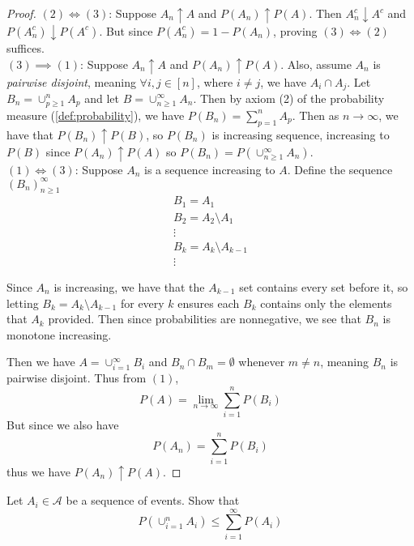 \documentclass[../main.tex]{subfiles}
\begin{document}
\begin{proof}
$ (2) \iff (3) $: Suppose $A_n \uparrow A$ and $P(A_n) \uparrow P(A)$.
Then $A_n^c \downarrow A^c$ and $P(A^c_n) \downarrow P(A^c)$. But since 
$P(A_n^c) = 1 - P(A_n)$, proving $(3) \iff (2)$ suffices.\\
$(3) \implies (1) $: Suppose $A_n \uparrow A$ and $P(A_n) \uparrow P(A)$. Also, assume 
$A_n$ is \textit{pairwise disjoint}, meaning $\forall i,j \in [n]$, where $i\neq j$, we have $A_i \cap A_j$.
Let $B_n = \cup^n_{p\geq 1}{A_p}$ and let $B = \cup^\infty_{n\geq 1}{A_n}$.
Then by axiom (2) of the probability measure (\ref{def:probability}), we have
$P(B_n) = \sum^n_{p=1}{A_p}$. Then as $n \to \infty$, we have that $P(B_n)\uparrow P(B)$, so $P(B_n)$ is
increasing sequence, increasing to $P(B)$ since $P(A_n) \uparrow P(A)$ so $P(B_n) = P(\cup^\infty_{n\geq 1}{A_n})$.\\
$ (1) \iff (3) $: Suppose $A_n$ is a sequence increasing to $A$. Define the sequence $(B_n)^\infty_{n\geq 1}$
\begin{gather*}
    B_1 = A_1 \\
    B_2 = A_2 \setminus A_1 \\
     \vdots \\
    B_k = A_k \setminus A_{k-1} \\
     \vdots 
\end{gather*}
\begin{remark} Since $A_n$ is increasing, we have that the $A_{k-1}$ set contains every
set before it, so letting $B_k = A_k \setminus A_{k-1}$ for every $k$ 
ensures each $B_k$ contains only the elements that $A_k$ provided. Then since probabilities are nonnegative, 
we see that $B_n$ is monotone increasing.
\end{remark}
Then we have $A= \cup^\infty_{i=1}{B_i}$ and $B_n \cap B_m = \emptyset$
whenever $m \neq n$, meaning $B_n$ is pairwise disjoint. Thus from $(1)$,\[
P(A) = \lim_{n\to\infty}{\sum^n_{i=1}{P(B_i)}}
\]
But since we also have \[
P(A_n) = \sum^n_{i=1}{P(B_i)}
\]
thus we have $P(A_n) \uparrow P(A)$.
\end{proof}










\begin{exercise}
Let $A_i \in \mathcal{A}$ be a sequence of events. Show that 
\[
P(\cup^n_{i=1}{A_i}) \leq \sum_{i=1}^{\infty}{P(A_i)} 
\]
\end{exercise}
\end{document}
